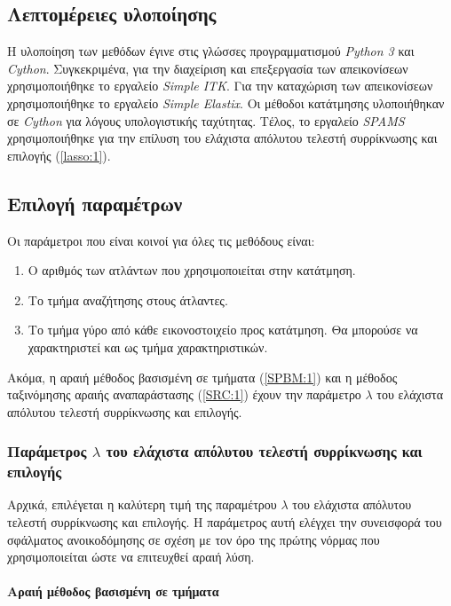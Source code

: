 \documentclass[a4paper,12pt]{article}
\newcommand{\paragraphLine}[1]{\paragraph{#1}\mbox{}\\}
\begin{document}
\subsection{Λεπτομέρειες υλοποίησης}

Η υλοποίηση των μεθόδων έγινε στις γλώσσες προγραμματισμού \emph{Python 3} και
\emph{Cython}. Συγκεκριμένα, για την διαχείριση και επεξεργασία των
απεικονίσεων χρησιμοποιήθηκε το εργαλείο \emph{Simple ITK}. Για την καταχώριση
των απεικονίσεων χρησιμοποιήθηκε το εργαλείο \emph{Simple Elastix}. Οι μέθοδοι
κατάτμησης υλοποιήθηκαν σε \emph{Cython} για λόγους υπολογιστικής ταχύτητας.
Τέλος, το εργαλείο \emph{SPAMS} χρησιμοποιήθηκε για την επίλυση του ελάχιστα
απόλυτου τελεστή συρρίκνωσης και επιλογής (\ref{lasso:1}).

\subsection{Επιλογή παραμέτρων}

Οι παράμετροι που είναι κοινοί για όλες τις μεθόδους είναι:

\begin{enumerate}
    \item Ο αριθμός των ατλάντων που χρησιμοποιείται στην κατάτμηση.
    \item Το τμήμα αναζήτησης στους άτλαντες.
    \item Το τμήμα γύρο από κάθε εικονοστοιχείο προς κατάτμηση. Θα μπορούσε να
          χαρακτηριστεί και ως τμήμα χαρακτηριστικών.
\end{enumerate}

Ακόμα, η αραιή μέθοδος βασισμένη σε τμήματα (\ref{SPBM:1}) και η μέθοδος
ταξινόμησης αραιής αναπαράστασης (\ref{SRC:1}) έχουν την παράμετρο $\lambda$ του
ελάχιστα απόλυτου τελεστή συρρίκνωσης και επιλογής.

\subsubsection{Παράμετρος $\lambda$ του ελάχιστα απόλυτου τελεστή συρρίκνωσης
και επιλογής}

Αρχικά, επιλέγεται η καλύτερη τιμή της παραμέτρου $\lambda$ του ελάχιστα
απόλυτου τελεστή συρρίκνωσης και επιλογής. Η παράμετρος αυτή ελέγχει την
συνεισφορά του σφάλματος ανοικοδόμησης σε σχέση με τον όρο της πρώτης νόρμας που
χρησιμοποιείται ώστε να επιτευχθεί αραιή λύση.

\paragraphLine{Αραιή μέθοδος βασισμένη σε τμήματα}
\end{document}
